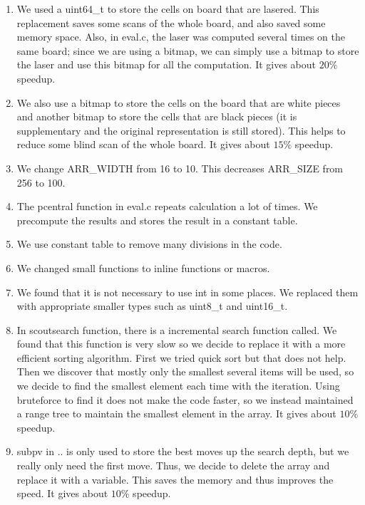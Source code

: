 \documentclass[10pt,twosidep]{article}
\begin{document}
\begin{enumerate}
	\item We used a uint64\_t to store the cells on board that are lasered. This replacement saves some scans of the whole board, and also saved some memory space. Also, in eval.c, the laser was computed several times on the same board; since we are using a bitmap, we can simply use a bitmap to store the laser and use this bitmap for all the computation. It gives about $20\%$ speedup. 
	
		\item We also use a bitmap to store the cells on the board that are white pieces and another bitmap to store the cells that are black pieces (it is supplementary and the original representation is still stored). This helps to reduce some blind scan of the whole board.  It gives about $15\%$ speedup. 


	\item We change ARR\_WIDTH from 16 to 10. This decreases ARR\_SIZE from 256 to 100. 
	\item The pcentral function in eval.c repeats calculation a lot of times. We precompute the results and stores the result in a constant table.
	\item We use constant table to remove many divisions in the code.
	\item We changed small functions to inline functions or macros.
	\item We found that it is not necessary to use int in some places. We replaced them with appropriate smaller types such as uint8\_t and uint16\_t.
		
	
	\item In scoutsearch function, there is a incremental search function called. We found that this function is very slow so we decide to replace it with a more efficient sorting algorithm. First we tried quick sort but that does not help. Then we discover that mostly only the smallest several items will be used, so we decide to find the smallest element each time with the iteration. Using bruteforce to find it does not make the code faster, so we instead maintained a range tree to maintain the smallest element in the array. It gives about $10\%$ speedup. 
	
	\item subpv in .. is only used to store the best moves up the search depth, but we really only need the first move. Thus, we decide to delete the array and replace it with a variable. This saves the memory and thus improves the speed. It gives about $10\%$ speedup. 
	
	
\end{enumerate}
\end{document}

